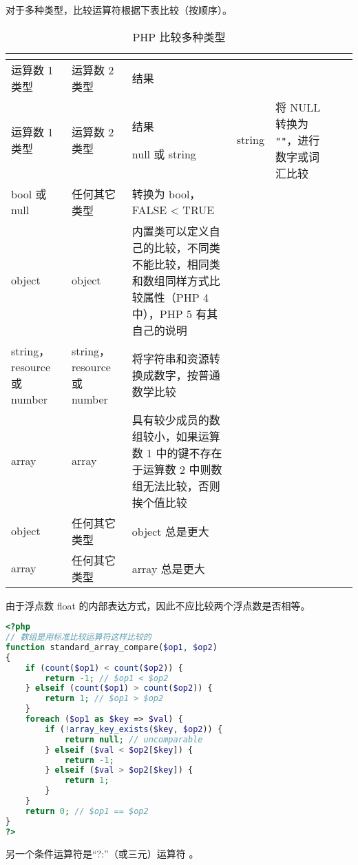 对于多种类型，比较运算符根据下表比较（按顺序）。


\begin{longtable}{|m{90pt}|m{90pt}|m{200pt}|}
\tabularnewline\hline
运算数 1 类型	&运算数 2 类型	&结果
\endhead

\caption{PHP 比较多种类型}\\
\hline
运算数 1 类型	&运算数 2 类型	&结果
\endfirsthead

\endfoot

\endlastfoot
\hline
null 或 string	&string	&将 NULL 转换为 \texttt{""}，进行数字或词汇比较\\
\hline
bool 或 null	&任何其它类型	&转换为 bool，FALSE < TRUE\\
\hline
object	&object	 &内置类可以定义自己的比较，不同类不能比较，相同类和数组同样方式比较属性（PHP 4 中），PHP 5 有其自己的说明\\
\hline
string，resource 或 number	&string，resource 或 number	&将字符串和资源转换成数字，按普通数学比较\\
\hline
array	&array	 &具有较少成员的数组较小，如果运算数 1 中的键不存在于运算数 2 中则数组无法比较，否则挨个值比较\\
\hline
object	&任何其它类型	&object 总是更大\\
\hline
array	&任何其它类型	&array 总是更大\\
\hline
\end{longtable}




由于浮点数 float 的内部表达方式，因此不应比较两个浮点数是否相等。


\begin{lstlisting}[language=PHP]
<?php
// 数组是用标准比较运算符这样比较的
function standard_array_compare($op1, $op2)
{
    if (count($op1) < count($op2)) {
        return -1; // $op1 < $op2
    } elseif (count($op1) > count($op2)) {
        return 1; // $op1 > $op2
    }
    foreach ($op1 as $key => $val) {
        if (!array_key_exists($key, $op2)) {
            return null; // uncomparable
        } elseif ($val < $op2[$key]) {
            return -1;
        } elseif ($val > $op2[$key]) {
            return 1;
        }
    }
    return 0; // $op1 == $op2
}
?>
\end{lstlisting}

另一个条件运算符是“?:”（或三元）运算符 。


